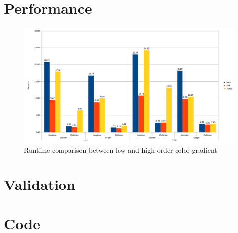 \documentclass[12pt]{book}
\begin{document}
\section{Performance}\label{app:perfo}
  \begin{figure}[H]
  	\centering
  	\includegraphics[width=\linewidth]{Resources/Images/highComp.png}
  	\caption{Runtime comparison between low and high order color gradient}
  	\label{fig:highComp}
  \end{figure}
\section{Validation}
\section{Code}
\end{document}
